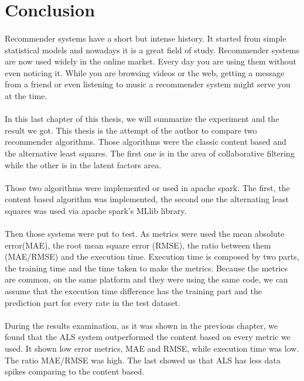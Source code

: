 \newpage
\section{Conclusion}
\paragraph{}Recommender systems have a short but intense history. It started from simple statistical models and nowadays it is a great field of study. Recommender systems are now used widely in the online market. Every day you are using them without even noticing it. While you are browsing videos or the web, getting a message from a friend or even listening to music a recommender system might serve you at the time.

\paragraph{} In this last chapter of this thesis, we will summarize the experiment and the result we got. This thesis is the attempt of the author to compare two recommender algorithms. Those algorithms were the classic content based and the alternative least squares. The first one is in the area of collaborative filtering while the other is in the latent factors area.

\paragraph{} Those two algorithms were implemented or used in apache spark. The first, the content based algorithm was implemented, the second one the alternating least squares was used via apache spark's MLlib library.

\paragraph{} Then those systems were put to test. As metrics were used the mean absolute error(MAE), the root mean square error (RMSE), the ratio between them (MAE/RMSE) and the execution time. Execution time is composed by two parts, the training time and the time taken to make the metrics. Because the metrics are common, on the same platform and they were using the same code, we can assume that the execution time difference has the training part and the prediction part for every rate in the test dataset.

\paragraph{} During the results examination, as it was shown in the previous chapter, we found that the ALS system outperformed the content based on every metric we used. It shown low error metrics, MAE and RMSE, while execution time was low. The ratio MAE/RMSE was high. The last showed us that ALS has less data spikes comparing to the content based.

